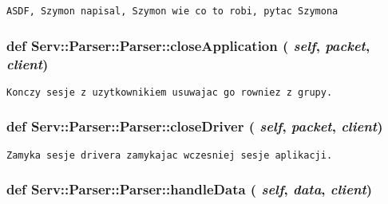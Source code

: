 \footnotesize\begin{verbatim}ASDF, Szymon napisal, Szymon wie co to robi, pytac Szymona\end{verbatim}
\normalsize
 \hypertarget{class_serv_1_1_parser_1_1_parser_fc14060e753dc6d502e33a46b168f6c0}{
\subsubsection[{closeApplication}]{\setlength{\rightskip}{0pt plus 5cm}def Serv::Parser::Parser::closeApplication ( {\em self}, \/   {\em packet}, \/   {\em client})}}
\label{class_serv_1_1_parser_1_1_parser_fc14060e753dc6d502e33a46b168f6c0}




\footnotesize\begin{verbatim}Konczy sesje z uzytkownikiem usuwajac go rowniez z grupy.\end{verbatim}
\normalsize
 \hypertarget{class_serv_1_1_parser_1_1_parser_1e840af17ebce4b0a649dcebb10ba0dd}{
\subsubsection[{closeDriver}]{\setlength{\rightskip}{0pt plus 5cm}def Serv::Parser::Parser::closeDriver ( {\em self}, \/   {\em packet}, \/   {\em client})}}
\label{class_serv_1_1_parser_1_1_parser_1e840af17ebce4b0a649dcebb10ba0dd}




\footnotesize\begin{verbatim}Zamyka sesje drivera zamykajac wczesniej sesje aplikacji.\end{verbatim}
\normalsize
 \hypertarget{class_serv_1_1_parser_1_1_parser_060ed5ba3cbf55b63ecc3f3aa006da04}{
\subsubsection[{handleData}]{\setlength{\rightskip}{0pt plus 5cm}def Serv::Parser::Parser::handleData ( {\em self}, \/   {\em data}, \/   {\em client})}}
\label{class_serv_1_1_parser_1_1_parser_060ed5ba3cbf55b63ecc3f3aa006da04}




